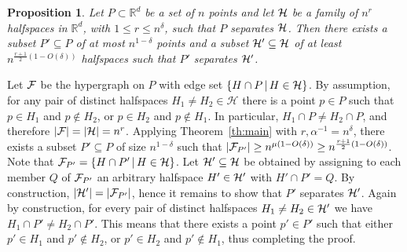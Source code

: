 \documentclass[11pt]{article}
\makeatletter
\renewenvironment{proof}[1][\proofname]
{\par\pushQED{\qed}
	\normalfont\topsep6\p@\@plus6\p@\relax\trivlist
	\item[\hskip\labelsep\bfseries#1\@addpunct{.}]
	\ignorespaces}
{\popQED\endtrivlist\@endpefalse}
\newtheorem{prop}[theo]{Proposition}
\newcommand{\FF}{{\cal F}}
\newcommand{\R}{{\mathbb R}}
\renewcommand{\a}{\alpha}
\renewcommand{\d}{\delta}
\newcommand{\HH}{{\cal H}}
\newcommand{\C}{\mu}
\makeatother
\begin{document}
\begin{prop}\label{pr:tr}
	Let $P \subset \R^d$ be a set of $n$ points and let $\HH$ be a family of $n^r$ halfspaces in $\R^d$, with $1 \le r \le n^\d$, such that $P$ separates $\HH$.  
	Then there exists a subset $P' \subseteq P$ of at most $n^{1-\d}$ points and
	a subset $\HH' \subseteq \HH$ of at least $n^{\frac{r+1}{2}(1-O(\d))}$ halfspaces such that $P'$ separates $\HH'$.
%	
\end{prop}
\begin {proof}
Let $\FF$ be the hypergraph on $P$ with edge set $\{H \cap P \,\vert\, H \in \HH\}$. 
By assumption, for any pair of distinct halfspaces $H_1 \neq H_2 \in \mathcal H$ there is a point $p \in P$ such that $p\in H_1$ and $p\not\in H_2$, or $p \in H_2$ and $p \notin H_1$. In particular, $H_1\cap P \ne H_2 \cap P$, and therefore $|\FF| = |\HH| = n^r$. 
Applying Theorem~\ref{th:main} with $r,\a^{-1} = n^{\d}$, there exists a subset $P' \subseteq P$ of size $n^{1-\d}$ such that $|\FF_{P'}| \ge n^{\C(1-O(\d))} \ge n^{\frac{r+1}{2}(1-O(\d))}$. 
Note that $\FF_{P'}=\{H \cap P' \,\vert\, H \in \HH\}$. Let $\HH' \subseteq \HH$ be obtained by assigning to each member $Q$ of $\FF_{P'}$ an arbitrary halfspace $H' \in \HH'$ with $H' \cap P' = Q$. 
By construction, $|\HH'|=|\FF_{P'}|$, hence it remains to show that $P'$ separates $\HH'$.
Again by construction, for every pair of distinct halfspaces $H_1 \neq H_2 \in \HH'$ we have $H_1 \cap P' \neq H_2 \cap P'$. 
This means that there exists a point $p' \in P'$ such that either $p' \in H_1$ and $p' \notin H_2$, or $p' \in H_2$ and $p' \notin H_1$, thus completing the proof. 
%
\end {proof}
\end{document}
